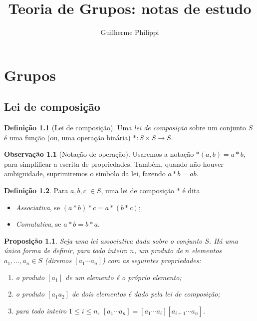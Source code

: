 \documentclass[a4paper,12pt]{report}
\title{Teoria de Grupos: notas de estudo}
\author{Guilherme Philippi}
\theoremstyle{plain}
\newtheorem{proposicao}{Proposição}[section]
\theoremstyle{definition}
\newtheorem{definicao}{Definição}[section]
\newtheorem{observacao}{Observação}[section]
\begin{document}
\maketitle
\tableofcontents

\chapter{Grupos}

\section{Lei de composição}

\begin{definicao}[Lei de composição]
	Uma \emph{lei de composição} sobre um conjunto \(S\) é uma função (ou, uma operação binária) \(*: S\times S \longrightarrow S\).
\end{definicao}

\begin{observacao}[Notação de operação]
	Usaremos a notação \(*(a,b) = a*b\), para simplificar a escrita de
	propriedades. Também, quando não houver ambiguidade, suprimiremos o simbolo da lei, fazendo $a*b = ab$.
\end{observacao}


\begin{definicao}
	Para $a,b,c \; \in S$, uma lei de composição $*$ é dita
	
	\begin{itemize}
		\item \emph{Associativa}, se $(a*b)*c = a*(b*c)$;
		\item \emph{Comutativa}, se \(a*b = b*a\).
	\end{itemize}
\end{definicao}

\begin{proposicao}
	Seja uma lei associativa dada sobre o conjunto
	\(S\). Há uma única forma de definir, para todo inteiro \(n\), um
	produto de \(n\) elementos \(a_1,\dots,a_n \in S\) (diremos
	\([a_1\dotsb a_n]\)) com as seguintes propriedades:
	
	\begin{enumerate}
		\def\labelenumi{\arabic{enumi}.}
		\item
		o produto \([a_1]\) de um elemento é o próprio elemento;
		\item
		o produto \([a_1a_2]\) de dois elementos é dado pela lei de
		composição;
		\item
		para todo inteiro \(1\leq i\leq n\),
		\([a_1\dotsb a_n] = [a_1\dotsb a_i][a_{i+1}\dotsb a_n]\).
	\end{enumerate}
\end{proposicao}
\end{document}
